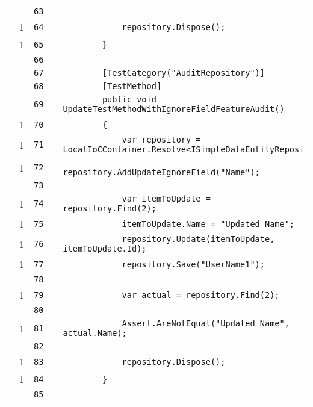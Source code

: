 \documentclass[a4paper,10pt]{article}
\begin{document}
\begin{longtable}[l]{lrrll}
\cellcolor{gray} &  & \verb~63~ & & \verb~~\\
\cellcolor{green} & 1 & \verb~64~ & & \verb~            repository.Dispose();~\\
\cellcolor{green} & 1 & \verb~65~ & & \verb~        }~\\
\cellcolor{gray} &  & \verb~66~ & & \verb~~\\
\cellcolor{gray} &  & \verb~67~ & & \verb~        [TestCategory("AuditRepository")]~\\
\cellcolor{gray} &  & \verb~68~ & & \verb~        [TestMethod]~\\
\cellcolor{gray} &  & \verb~69~ & & \verb~        public void UpdateTestMethodWithIgnoreFieldFeatureAudit()~\\
\cellcolor{green} & 1 & \verb~70~ & & \verb~        {~\\
\cellcolor{green} & 1 & \verb~71~ & & \verb~            var repository = LocalIoCContainer.Resolve<ISimpleDataEntityReposi~\\
\cellcolor{green} & 1 & \verb~72~ & & \verb~            repository.AddUpdateIgnoreField("Name");~\\
\cellcolor{gray} &  & \verb~73~ & & \verb~~\\
\cellcolor{green} & 1 & \verb~74~ & & \verb~            var itemToUpdate = repository.Find(2);~\\
\cellcolor{green} & 1 & \verb~75~ & & \verb~            itemToUpdate.Name = "Updated Name";~\\
\cellcolor{green} & 1 & \verb~76~ & & \verb~            repository.Update(itemToUpdate, itemToUpdate.Id);~\\
\cellcolor{green} & 1 & \verb~77~ & & \verb~            repository.Save("UserName1");~\\
\cellcolor{gray} &  & \verb~78~ & & \verb~~\\
\cellcolor{green} & 1 & \verb~79~ & & \verb~            var actual = repository.Find(2);~\\
\cellcolor{gray} &  & \verb~80~ & & \verb~~\\
\cellcolor{green} & 1 & \verb~81~ & & \verb~            Assert.AreNotEqual("Updated Name", actual.Name);~\\
\cellcolor{gray} &  & \verb~82~ & & \verb~~\\
\cellcolor{green} & 1 & \verb~83~ & & \verb~            repository.Dispose();~\\
\cellcolor{green} & 1 & \verb~84~ & & \verb~        }~\\
\cellcolor{gray} &  & \verb~85~ & & \verb~~\\

\end{longtable}
\end{document}
